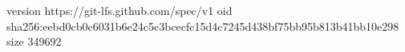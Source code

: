 version https://git-lfs.github.com/spec/v1
oid sha256:eebd0cb0c6031b6e24c5c3bcecfc15d4c7245d438bf75bb95b813b41bb10e298
size 349692
